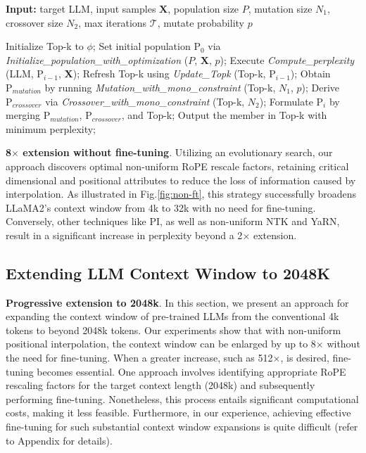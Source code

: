\begin{algorithm}[t]
	\small
	\caption{The search algorithm}
	\textbf{Input:} target LLM, input samples $\mathbf{X}$,   population size $P$, mutation size $N_1$, crossover size $N_2$, max iterations $\mathcal{T}$, mutate probability $p$\\

	\begin{algorithmic}[1]
		\label{alg:search}
		\STATE Initialize Top-k to $\phi$;
		\STATE Set initial population $\text{P}_0$ via \textit{Initialize\_population\_with\_optimization} ($P$, $\mathbf{X}$, $p$); 
		\STATE Execute \textit{Compute\_perplexity} (LLM, $\text{P}_{i-1}$, $\mathbf{X}$);
		\STATE Refresh Top-k using \textit{Update\_Topk} (Top-k, $\text{P}_{i-1}$);
		\STATE Obtain $\text{P}_{mutation}$ by running \textit{Mutation\_with\_mono\_constraint} (Top-k, $N_1$, $p$); 
		\STATE Derive $\text{P}_{crossover}$ via \textit{Crossover\_with\_mono\_constraint} (Top-k, $N_2$);
		\STATE Formulate $\text{P}_i$ by merging $\text{P}_{mutation}$, $\text{P}_{crossover}$, and Top-k;
		\ENDFOR
		\STATE Output the member in Top-k with minimum perplexity;
	\end{algorithmic}
\end{algorithm}

\textbf{8$\times$ extension without fine-tuning}. Utilizing an evolutionary search, our approach discovers optimal non-uniform RoPE rescale factors, retaining critical dimensional and positional attributes to reduce the loss of information caused by interpolation. As illustrated in Fig.\ref{fig:non-ft}, this strategy successfully broadens LLaMA2’s context window from 4k to 32k with no need for fine-tuning. Conversely, other techniques like PI, as well as non-uniform NTK and YaRN, result in a significant increase in perplexity beyond a 2$\times$ extension.

\subsection{Extending LLM Context Window to 2048K}
\label{sec:extendto2048k}

\textbf{Progressive extension to 2048k}. In this section, we present an approach for expanding the context window of pre-trained LLMs from the conventional 4k tokens to beyond 2048k tokens. Our experiments show that with non-uniform positional interpolation, the context window can be enlarged by up to 8$\times$ without the need for fine-tuning. When a greater increase, such as 512$\times$, is desired, fine-tuning becomes essential. One approach involves identifying appropriate RoPE rescaling factors for the target context length (2048k) and subsequently performing fine-tuning. Nonetheless, this process entails significant computational costs, making it less feasible. Furthermore, in our experience, achieving effective fine-tuning for such substantial context window expansions is quite difficult (refer to Appendix for details).


